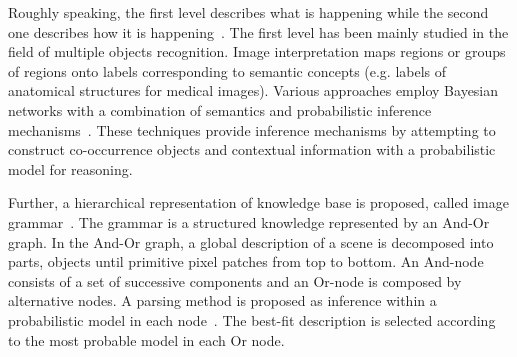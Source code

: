 \documentclass{article}
\begin{document}
Roughly speaking, the first level describes what is happening while the second one describes how it is happening~\cite{tsotsos1992image}.
The first level has been mainly studied in the field of multiple objects recognition. 
Image interpretation maps regions or groups of regions onto labels corresponding to semantic concepts (e.g. labels of anatomical structures for medical images).
Various approaches employ Bayesian networks with a combination of semantics and probabilistic inference mechanisms~\cite{Luo2005Bayesian,Niko2009evidence,Singhal2003proba}.
These techniques provide inference mechanisms by attempting to construct co-occurrence objects and contextual information with a probabilistic model for reasoning.

Further, a hierarchical representation of knowledge base is proposed, called image grammar~\cite{tu2014joint,zhu2006stochastic}. The grammar is a structured knowledge represented by an And-Or graph.
In the And-Or graph, a global description of a scene is decomposed into parts, objects until primitive pixel patches from top to bottom.
An And-node consists of a set of successive components and an Or-node is composed by alternative nodes.
A parsing method is proposed as inference within a probabilistic model in each node~\cite{han2009bottom,wu2011numerical}. 
The best-fit description is selected according to the most probable model in each Or node.
\end{document}
